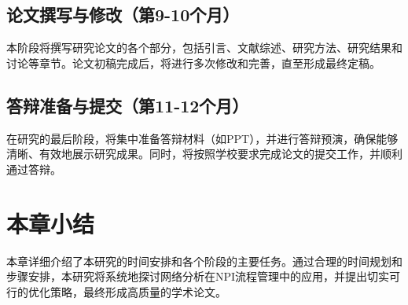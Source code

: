 \subsection{论文撰写与修改（第9-10个月）}
本阶段将撰写研究论文的各个部分，包括引言、文献综述、研究方法、研究结果和讨论等章节。论文初稿完成后，将进行多次修改和完善，直至形成最终定稿。

\subsection{答辩准备与提交（第11-12个月）}
在研究的最后阶段，将集中准备答辩材料（如PPT），并进行答辩预演，确保能够清晰、有效地展示研究成果。同时，将按照学校要求完成论文的提交工作，并顺利通过答辩。

\section{本章小结}
本章详细介绍了本研究的时间安排和各个阶段的主要任务。通过合理的时间规划和步骤安排，本研究将系统地探讨网络分析在NPI流程管理中的应用，并提出切实可行的优化策略，最终形成高质量的学术论文。

